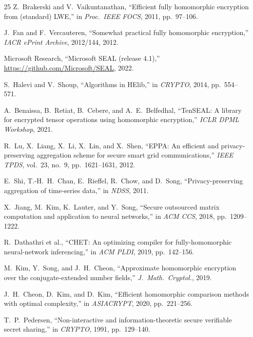 \documentclass[conference]{IEEEtran}
\begin{document}
\begin{thebibliography}{25}
Z.~Brakerski and V.~Vaikuntanathan, ``Efficient fully homomorphic encryption from (standard) LWE,'' in \emph{Proc.\ IEEE FOCS}, 2011, pp.~97--106.

J.~Fan and F.~Vercauteren, ``Somewhat practical fully homomorphic encryption,'' \emph{IACR ePrint Archive}, 2012/144, 2012.

Microsoft Research, ``Microsoft SEAL (release 4.1),'' \url{https://github.com/Microsoft/SEAL}, 2022.

S.~Halevi and V.~Shoup, ``Algorithms in HElib,'' in \emph{CRYPTO}, 2014, pp.~554--571.

A.~Benaissa, B.~Retiat, B.~Cebere, and A.~E.~Belfedhal, ``TenSEAL: A library for encrypted tensor operations using homomorphic encryption,'' \emph{ICLR DPML Workshop}, 2021.

R.~Lu, X.~Liang, X.~Li, X.~Lin, and X.~Shen, ``EPPA: An efficient and privacy-preserving aggregation scheme for secure smart grid communications,'' \emph{IEEE TPDS}, vol.~23, no.~9, pp.~1621--1631, 2012.

E.~Shi, T.-H.~H.~Chan, E.~Rieffel, R.~Chow, and D.~Song, ``Privacy-preserving aggregation of time-series data,'' in \emph{NDSS}, 2011.

X.~Jiang, M.~Kim, K.~Lauter, and Y.~Song, ``Secure outsourced matrix computation and application to neural networks,'' in \emph{ACM CCS}, 2018, pp.~1209--1222.

R.~Dathathri et al., ``CHET: An optimizing compiler for fully-homomorphic neural-network inferencing,'' in \emph{ACM PLDI}, 2019, pp.~142--156.

M.~Kim, Y.~Song, and J.~H.~Cheon, ``Approximate homomorphic encryption over the conjugate-extended number fields,'' \emph{J.\ Math.\ Cryptol.}, 2019.

J.~H.~Cheon, D.~Kim, and D.~Kim, ``Efficient homomorphic comparison methods with optimal complexity,'' in \emph{ASIACRYPT}, 2020, pp.~221--256.

T.~P.~Pedersen, ``Non-interactive and information-theoretic secure verifiable secret sharing,'' in \emph{CRYPTO}, 1991, pp.~129--140.


\end{thebibliography}
\end{document}

